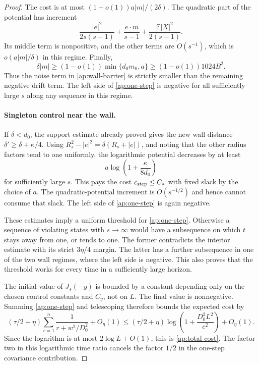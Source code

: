 \documentclass[11pt]{article}
\numberwithin{equation}{section}
\theoremstyle{definition}
\theoremstyle{remark}
\begin{document}
\begin{proof}
The cost is at most
\((1+o(1))a|m|/(2\delta)\).  The quadratic part of the potential
has increment
\[
 \frac{|e|^2}{2s(s-1)}+\frac{e\cdot m}{s-1}
                       +\frac{\mathbb E|X|^2}{2(s-1)}.
\]
Its middle term is nonpositive, and the other terms are \(O(s^{-1})\),
which is \(o(a|m|/\delta)\) in this regime.  Finally,
\[
 \delta|m|\geq(1-o(1))\min\{d_0m_0,a\}
                  \geq(1-o(1))1024B^2.
\]
Thus the noise term in \eqref{ap:wall-barrier} is strictly smaller
than the remaining negative drift term.  The left side of
\eqref{ap:one-step} is negative for all sufficiently large \(s\)
along any sequence in this regime.

\paragraph{Singleton control near the wall.}
If \(\delta<d_0\), the support estimate already proved gives the new
wall distance \(\delta'\geq\delta+\kappa/4\).  Using
\(R_s^2-|e|^2=\delta(R_s+|e|)\), and noting that the other radius
factors tend to one uniformly, the logarithmic potential decreases by
at least
\[
 a\log\left(1+\frac{\kappa}{8d_0}\right)
\]
for sufficiently large \(s\).  This pays the cost \(c_{\rm step}\leq C_*\)
with fixed slack by the choice of \(a\).  The quadratic-potential
increment is \(O(s^{-1/2})\) and hence cannot consume that slack.
The left side of \eqref{ap:one-step} is again negative.

These estimates imply a uniform threshold for \eqref{ap:one-step}.
Otherwise a sequence of violating states with \(s\to\infty\) would
have a subsequence on which \(t\) stays away from one, or tends to one.
The former contradicts the interior estimate with its strict
\(3\eta/4\) margin.  The latter has a further subsequence in one of
the two wall regimes, where the left side is negative.  This also proves
that the threshold works for every time in a sufficiently large horizon.

The initial value of \(J_s(-y)\) is bounded by a constant depending
only on the chosen control constants and \(C_y\), not on \(L\).
The final value is nonnegative.  Summing \eqref{ap:one-step} and
telescoping therefore bounds the expected cost by
\[
 (\tau/2+\eta)\sum_{r=1}^n
   \frac1{r+w^2/D_0^2}+O_\eta(1)
 \leq(\tau/2+\eta)
   \log\left(1+\frac{D_0^2L^2}{c^2}\right)+O_\eta(1).
\]
Since the logarithm is at most \(2\log L+O(1)\), this is
\eqref{ap:total-cost}.  The factor two in this logarithmic time ratio
cancels the factor \(1/2\) in the one-step covariance contribution.
\end{proof}
\end{document}
